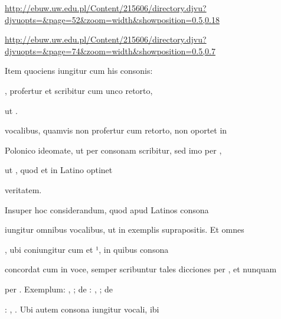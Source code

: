 
\newParkoszpage

{
\url{http://ebuw.uw.edu.pl/Content/215606/directory.djvu?djvuopts=&page=52&zoom=width&showposition=0.5,0.18}

\url{http://ebuw.uw.edu.pl/Content/215606/directory.djvu?djvuopts=&page=74&zoom=width&showposition=0.5,0.7}
}

\bigskip

\obeylines
\mono



\fullpreviouslines


{
\color{blue}

\indentK Item quociens iungitur cum his consonis: 

    , profertur et scribitur cum unco retorto,

}


\fulllines

ut    .

vocalibus, quamvis non profertur cum  retorto, non oportet in

Polonico ideomate,  ut per  consonam scribitur, sed imo per ,

ut    , quod et in Latino optinet

\splitlines

veritatem.

\indentK Insuper hoc considerandum, quod apud Latinos  consona

\fulllines

iungitur omnibus vocalibus, ut in exemplis suprapositis. Et omnes 

, ubi  coniungitur cum   et ¹, in quibus  consona

concordat cum  in voce, semper scribuntur tales dicciones per , et nunquam

per . Exemplum: , ; de : , ; de 

: , . Ubi autem  consona iungitur  vocali, ibi

